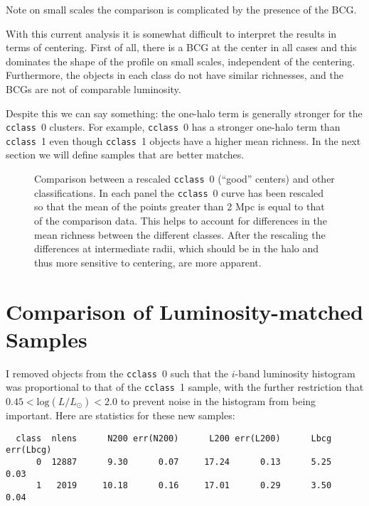 \documentclass[12pt,preprint]{aastex}
\newcommand{\cclass}{\texttt{cclass}}
\begin{document}
Note on small scales the comparison is complicated by the presence of the
BCG.



With this current analysis it is somewhat difficult to interpret the results in
terms of centering.  First of all, there is a BCG at the center in all cases
and this dominates the shape of the profile on small scales, independent of the
centering.  Furthermore, the objects in each class do not have similar
richnesses, and the BCGs are not of comparable luminosity.

Despite this we can say something:  the one-halo term is generally stronger for
the \cclass\ 0 clusters.  For example, \cclass\ 0 has a stronger one-halo
term than \cclass\ 1 even though \cclass\ 1 objects have a higher mean
richness.  In the next section we will define samples that are better
matches.


\begin{figure}[h]

\caption{Comparison between a rescaled \cclass\ 0 (``good'' centers) and other
classifications.  In each panel the \cclass\ 0 curve has been rescaled so that
the mean of the points greater than 2 Mpc is equal to that of the comparison
data.  This helps to account for differences in the mean richness between the
different classes.  After the rescaling the differences at intermediate radii,
which should be in the halo and thus more sensitive to centering, are more
apparent.}  \label{fig:comprescale}

\end{figure}



\section{Comparison of Luminosity-matched Samples}

I removed objects from the \cclass\ 0 such that the $i$-band luminosity
histogram was proportional to that of the \cclass\ 1 sample, with the further
restriction that $0.45 < \mathrm{log}(L/L_\odot) < 2.0$ to prevent noise in the
histogram from being important.  Here are statistics for these new samples:
\begin{verbatim}
  class  nlens      N200 err(N200)      L200 err(L200)      Lbcg err(Lbcg)
      0  12887      9.30      0.07     17.24      0.13      5.25      0.03
      1   2019     10.18      0.16     17.01      0.29      3.50      0.04
\end{verbatim}
\end{document}
